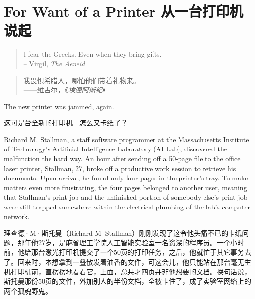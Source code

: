 \chapter{\ifdefined\eng
For Want of a Printer
\fi
\ifdefined\chs
从一台打印机说起
\fi
}

\ifdefined\eng
\begin{quotation}
  \begin{flushright}
    I fear the Greeks. Even when they bring gifts.\\
    -- Virgil, \textit{The Aeneid}
  \end{flushright}
\end{quotation}
\fi

\ifdefined\chs
\begin{quotation}
  \begin{flushright}
   我畏惧希腊人，哪怕他们带着礼物来。\\
    ——维吉尔，《\textit{埃涅阿斯纪}》
  \end{flushright}
\end{quotation}
\fi

\ifdefined\eng
The new printer was jammed, again.
\fi

\ifdefined\chs
这可是台全新的打印机！怎么又卡纸了？
\fi

\ifdefined\eng
Richard M. Stallman, a staff software programmer at the Massachusetts Institute of Technology's Artificial Intelligence Laboratory (AI Lab), discovered the malfunction the hard way. An hour after sending off a 50-page file to the office laser printer, Stallman, 27, broke off a productive work session to retrieve his documents. Upon arrival, he found only four pages in the printer's tray. To make matters even more frustrating, the four pages belonged to another user, meaning that Stallman's print job and the unfinished portion of somebody else's print job were still trapped somewhere within the electrical plumbing of the lab's computer network.
\fi

\ifdefined\chs
理查德·M·斯托曼（Richard M. Stallman）刚刚发现了这令他头痛不已的卡纸问题，那年他27岁，是麻省理工学院人工智能实验室一名资深的程序员。一个小时前，他给那台激光打印机提交了一个50页的打印任务，之后，他就忙于其它事务去了。回来时，本想拿到一叠散发着油香的文件，可这会儿，他只能站在那台毫无生机打印机前，直楞楞地看着它，上面，总共才四页并非他想要的文档。换句话说，斯托曼那份50页的文件，外加别人的半份文档，全被卡住了，成了实验室网络上的两个孤魂野鬼。
\fi

